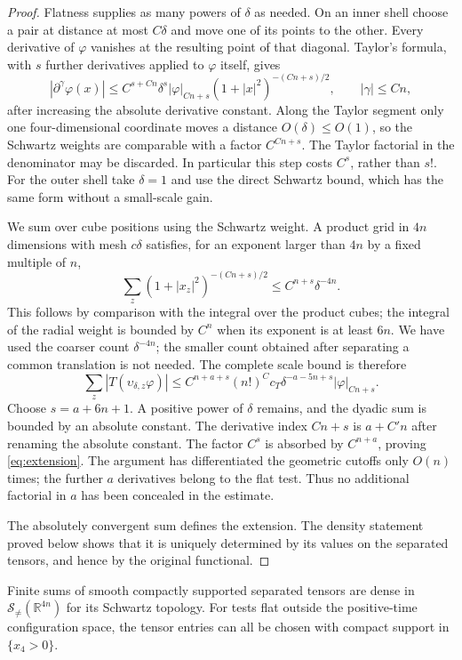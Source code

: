 \documentclass[11pt,letterpaper,reqno]{amsart}
\makeatletter
\theoremstyle{definition}
\newcommand{\ms@minorstart}{%
  \pushQED{\qed}\renewcommand{\qedsymbol}{$\blacksquare$}}
\newenvironment{lemma}[1][]{\ms@minorstart\ms@lemma[#1]}
  {\popQED\endms@lemma}
\theoremstyle{remark}
\newcommand{\R}{\mathbb R}
\newcommand{\cS}{\mathcal S}
\makeatother
\begin{document}
\begin{proof}
Flatness supplies as many powers of $\delta$ as needed. On an inner
shell choose a pair at distance at most $C\delta$ and move one of
its points to the other. Every derivative of $\varphi$ vanishes at
the resulting point of that diagonal. Taylor's formula, with $s$
further derivatives applied to $\varphi$ itself, gives
\[
 |\partial^\gamma\varphi(x)|
   \le C^{s+Cn}\delta^s
          |\varphi|_{Cn+s}(1+|x|^2)^{-(Cn+s)/2},
 \qquad |\gamma|\le Cn,
\]
after increasing the absolute derivative constant. Along the Taylor
segment only one four-dimensional coordinate moves a distance
$O(\delta)\le O(1)$, so the Schwartz weights are comparable with
a factor $C^{Cn+s}$. The Taylor factorial in the denominator may be
discarded. In particular this step costs $C^s$, rather than $s!$.
For the outer shell take $\delta=1$ and use the direct Schwartz
bound, which has the same form without a small-scale gain.

We sum over cube positions using the Schwartz weight. A product grid
in $4n$ dimensions with mesh $c\delta$ satisfies, for an exponent
larger than $4n$ by a fixed multiple of $n$,
\[
 \sum_z(1+|x_z|^2)^{-(Cn+s)/2}
                 \le C^{n+s}\delta^{-4n}.
\]
This follows by comparison with the integral over the product cubes;
the integral of the radial weight is bounded by $C^n$ when its
exponent is at least $6n$. We have used the coarser count
$\delta^{-4n}$; the smaller count obtained after separating a common
translation is not needed. The complete scale bound is therefore
\[
 \sum_z|T(\upsilon_{\delta,z}\varphi)|
   \le C^{n+a+s}(n!)^Cc_T
                 \delta^{-a-5n+s}|\varphi|_{Cn+s}.
\]
Choose $s=a+6n+1$. A positive power of $\delta$ remains, and the
dyadic sum is bounded by an absolute constant. The derivative index
$Cn+s$ is $a+C'n$ after renaming the absolute constant. The factor
$C^s$ is absorbed by $C^{n+a}$, proving \eqref{eq:extension}.
The argument has differentiated the geometric cutoffs only $O(n)$
times; the further $a$ derivatives belong to the flat test. Thus no
additional factorial in $a$ has been concealed in the estimate.

The absolutely convergent sum defines the extension. The density
statement proved below shows that it is uniquely determined by its
values on the separated tensors, and hence by the original functional.
\end{proof}

\begin{lemma}[Density on the flat test spaces]\label{lem:flat-test-density}
Finite sums of smooth compactly supported separated tensors are dense
in $\cS_{\ne}(\R^{4n})$ for its Schwartz topology. For tests flat
outside the positive-time configuration space, the tensor entries can
all be chosen with compact support in $\{x_4>0\}$.
\end{lemma}
\end{document}
